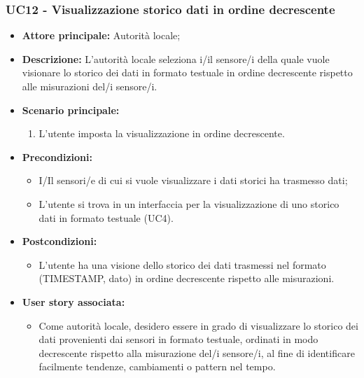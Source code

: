 \subsubsection{UC12 - Visualizzazione storico dati in ordine decrescente}
\begin{itemize}
    \item \textbf{Attore principale:} Autorità locale;
    \item \textbf{Descrizione:} L’autorità locale seleziona i/il sensore/i della quale vuole visionare lo storico dei dati in formato testuale in ordine decrescente rispetto alle misurazioni del/i sensore/i.
    \item \textbf{Scenario principale:}
          \begin{enumerate}
              \item L'utente imposta la visualizzazione in ordine decrescente.
          \end{enumerate}
    \item \textbf{Precondizioni:}
          \begin{itemize}
              \item  I/Il sensori/e di cui si vuole visualizzare i dati storici ha trasmesso dati;
              \item  L'utente si trova in un interfaccia per la visualizzazione di uno storico dati in formato testuale (UC4).
          \end{itemize}
    \item \textbf{Postcondizioni:}
          \begin{itemize}
              \item  L'utente ha una visione dello storico dei dati trasmessi nel formato (TIMESTAMP, dato) in ordine decrescente rispetto alle misurazioni.
          \end{itemize}
    \item \textbf{User story associata:}
          \begin{itemize}
            \item Come autorità locale, desidero essere in grado di visualizzare lo storico dei dati provenienti dai sensori in formato testuale, ordinati in modo decrescente rispetto alla misurazione del/i sensore/i, al fine di identificare facilmente tendenze, cambiamenti o pattern nel tempo.
          \end{itemize}
\end{itemize}